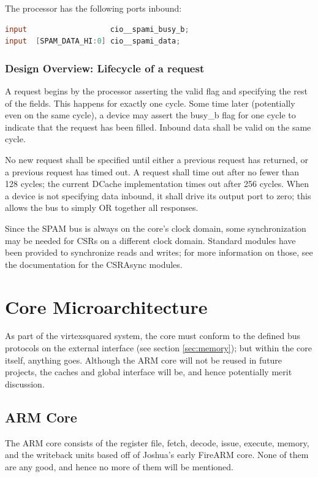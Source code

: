 \documentclass[10pt]{article}
\begin{document}
The processor has the following ports inbound:

\begin{lstlisting}[basicstyle=\footnotesize,language=Verilog]
input                   cio__spami_busy_b;
input  [SPAM_DATA_HI:0] cio__spami_data;
\end{lstlisting}

\subsubsection{Design Overview: Lifecycle of a request}

A request begins by the processor asserting the valid flag and specifying
the rest of the fields. This happens for exactly one cycle. Some time later
(potentially even on the same cycle), a device may assert the busy\_b flag
for one cycle to indicate that the request has been filled. Inbound data
shall be valid on the same cycle.

No new request shall be specified until either a previous request has returned, 
or a previous request has timed out. A request shall time out after no fewer 
than 128 cycles; the current DCache implementation times out after 256 cycles. 
When a device is not specifying data inbound, it shall drive its output port to 
zero; this allows the bus to simply OR together all responses.

Since the SPAM bus is always on the core's clock domain, some synchronization 
may be needed for CSRs on a different clock domain. Standard modules have been 
provided to synchronize reads and writes; for more information on those, see 
the documentation for the CSRAsync modules. 

\section{Core Microarchitecture}

As part of the virtexsquared system, the core must conform to the defined
bus protocols on the external interface (see section \ref{sec:memory}); but
within the core itself, anything goes.  Although the ARM core will not be
reused in future projects, the caches and global interface will be, and
hence potentially merit discussion.

\subsection{ARM Core}

The ARM core consists of the register file, fetch, decode, issue, execute,
memory, and the writeback units based off of Joshua's early FireARM core.
None of them are any good, and hence no more of them will be mentioned.
\end{document}
